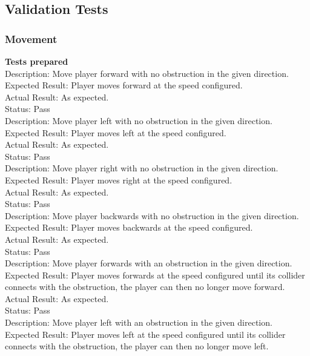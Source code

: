 \documentclass[11pt,a4paper]{article}
\begin{document}
\subsection{Validation Tests}
\subsubsection{Movement}
\textbf{Tests prepared}\\
Description: Move player forward with no obstruction in the given direction.\\
Expected Result: Player moves forward at the speed configured.\\
Actual Result: As expected.\\
Status: Pass
\smallskip\\
Description: Move player left with no obstruction in the given direction.\\
Expected Result: Player moves left at the speed configured.\\
Actual Result: As expected.\\
Status: Pass
\smallskip\\
Description: Move player right with no obstruction in the given direction.\\
Expected Result: Player moves right at the speed configured.\\
Actual Result: As expected.\\
Status: Pass
\smallskip\\
Description: Move player backwards with no obstruction in the given direction.\\
Expected Result: Player moves backwards at the speed configured.\\
Actual Result: As expected.\\
Status: Pass
\smallskip\\
Description: Move player forwards with an obstruction in the given direction.\\
Expected Result: Player moves forwards at the speed configured until its collider connects with the obstruction, the player can then no longer move forward.\\
Actual Result: As expected.\\
Status: Pass
\smallskip\\
Description: Move player left with an obstruction in the given direction.\\
Expected Result: Player moves left at the speed configured until its collider connects with the obstruction, the player can then no longer move left.\\
\end{document}
